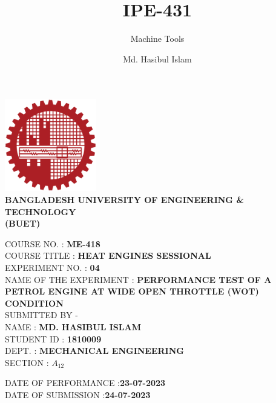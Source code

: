 \documentclass[14pt]{article}
\title{IPE-431}
\author{Md. Hasibul Islam}
\subtitle{Machine Tools}
\date{}
\begin{document}
\begin{titlepage}
    \centering
    \includegraphics[width=4cm]{institution_logo.jpg}\\
    \vspace*{1cm}
    \textbf{\MakeTextUppercase{Bangladesh University of Engineering \& Technology}} \\

    \textbf{\MakeTextUppercase{(BUET)}} \\
    \vspace*{2cm}
    \raggedright
    \MakeTextUppercase{Course No.} : \textbf{ME-418}\\
    \vspace*{0.5cm}
    \MakeTextUppercase{Course Title} : \textbf{HEAT ENGINES SESSIONAL} \\ 
    \vspace*{1cm}
    \MakeTextUppercase{Experiment No.} : \textbf{04} \\
    \vspace*{0.5cm}
    \MakeTextUppercase{Name of the Experiment} : \textbf{PERFORMANCE TEST OF A PETROL ENGINE AT WIDE OPEN THROTTLE (WOT) CONDITION}\\
 
    \vspace*{2.5cm} 
    \MakeTextUppercase{Submitted By -} \\
    \vspace*{0.5cm}
    \MakeTextUppercase{Name}        : \hspace{2cm}\textbf{MD. HASIBUL ISLAM} \\
    \vspace*{0.5cm}
    \MakeTextUppercase{Student id}  : \hspace{1cm}\textbf{1810009} \\
    \vspace*{0.5cm}
    \MakeTextUppercase{Dept.}       : \hspace{2cm}\textbf{MECHANICAL ENGINEERING} \\
    \vspace*{0.5cm}
    \MakeTextUppercase{section}     : \hspace{1.5cm}\textbf{$A_{12}$} \\

    \vspace*{2cm}

    \MakeTextUppercase{Date of Performance}     :\hspace{1.5cm}\textbf{23-07-2023}\\
    \vspace*{0.5cm}
    \MakeTextUppercase{Date of Submission}      :\hspace{2cm}\textbf{24-07-2023}\\

    \vfill
\end{titlepage}
\pagebreak
\end{document}
